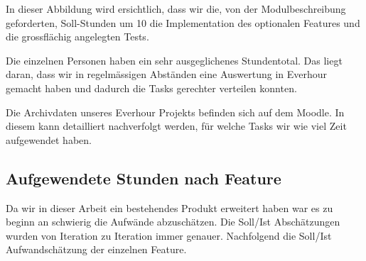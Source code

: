 In dieser Abbildung wird ersichtlich, dass wir die, von der Modulbeschreibung geforderten, 
Soll-Stunden um 10%
die Implementation des optionalen Features und die grossflächig angelegten Tests.




Die einzelnen Personen haben ein sehr ausgeglichenes Stundentotal. 
Das liegt daran, dass wir in regelmässigen Abständen eine Auswertung 
in Everhour gemacht haben und dadurch die Tasks gerechter verteilen konnten. 

Die Archivdaten unseres Everhour Projekts befinden sich auf dem Moodle. 
In diesem kann detailliert nachverfolgt werden, 
für welche Tasks wir wie viel Zeit aufgewendet haben.


\subsection{Aufgewendete Stunden nach Feature}
Da wir in dieser Arbeit ein bestehendes Produkt erweitert haben war es zu beginn an
schwierig die Aufwände abzuschätzen. Die Soll/Ist Abschätzungen wurden von Iteration zu Iteration
immer genauer. Nachfolgend die Soll/Ist Aufwandschätzung der einzelnen Feature.


